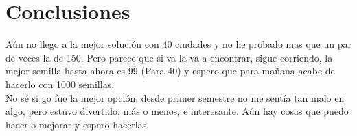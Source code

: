 \documentclass[
10pt,
a4paper,
oneside,
headinclude,footinclude,
BCOR5mm,
]{article}
\begin{document}
\section{Conclusiones}
Aún no llego a la mejor solución con 40 ciudades y no he probado mas que un par
de veces la de 150. Pero parece que si va la va a encontrar, sigue corriendo, la
mejor semilla hasta ahora es 99 (Para 40) y espero que para mañana acabe de
hacerlo con 1000 semillas.\\
No sé si go fue la mejor opción, desde primer semestre no me sentía tan malo en
algo, pero estuvo divertido, más o menos, e interesante. Aún hay cosas que puedo
hacer o mejorar y espero hacerlas.

{
  \nocite{canek}
  \nocite{papadimitriou}
}

\end{document}
